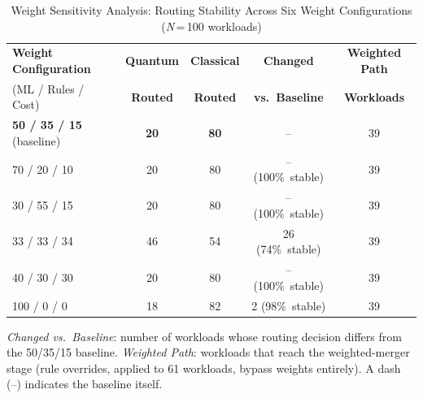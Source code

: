 \begin{table}[!t]
\caption{Weight Sensitivity Analysis: Routing Stability Across Six Weight Configurations (\textit{N}\,=\,100 workloads)}
\label{tab:weight-sensitivity}
\centering
\setlength{\tabcolsep}{4pt}
\begin{tabular}{lcccc}
\toprule
\textbf{Weight Configuration} & \textbf{Quantum} & \textbf{Classical} & \textbf{Changed} & \textbf{Weighted Path} \\
(ML / Rules / Cost) & \textbf{Routed} & \textbf{Routed} & \textbf{vs.\ Baseline} & \textbf{Workloads} \\
\midrule
\textbf{50 / 35 / 15} (baseline) & \textbf{20} & \textbf{80} & -- & 39 \\
70 / 20 / 10 & 20 & 80 & -- (100\%\ stable) & 39 \\
30 / 55 / 15 & 20 & 80 & -- (100\%\ stable) & 39 \\
33 / 33 / 34 & 46 & 54 & 26 (74\%\ stable) & 39 \\
40 / 30 / 30 & 20 & 80 & -- (100\%\ stable) & 39 \\
100 / 0 / 0 & 18 & 82 & 2 (98\%\ stable) & 39 \\
\bottomrule
\end{tabular}
\vspace{2pt}
\begin{minipage}{\linewidth}\footnotesize\textit{Changed vs.\ Baseline}: number of workloads whose routing decision differs from the 50/35/15 baseline. \textit{Weighted Path}: workloads that reach the weighted-merger stage (rule overrides, applied to 61 workloads, bypass weights entirely). A dash (--) indicates the baseline itself.\end{minipage}
\end{table}
